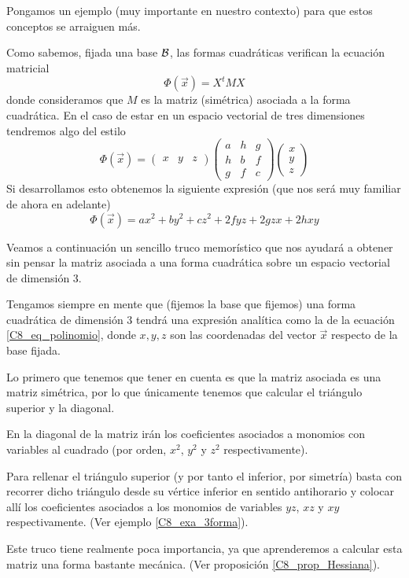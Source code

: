 Pongamos un ejemplo (muy importante en nuestro contexto) para que estos conceptos se arraiguen más.
\begin{exa}
	\label{C8_exa_3forma}
	Como sabemos, fijada una base $\mathcal{B}$, las formas cuadráticas verifican la ecuación matricial
	\[\Phi(\vec{x})=X^tMX\]
	donde consideramos que $M$ es la matriz (simétrica) asociada a la forma cuadrática. En el caso de estar en un espacio vectorial de tres dimensiones tendremos algo del estilo
	\[\Phi(\vec{x})=\begin{pmatrix}
	x & y & z
	\end{pmatrix}\begin{pmatrix}
	a & h & g\\
	h & b & f\\
	g & f & c
	\end{pmatrix}\begin{pmatrix}
	x\\
	y\\
	z
	\end{pmatrix}\]
	Si desarrollamos esto obtenemos la siguiente expresión (que nos será muy familiar de ahora en adelante)
	\begin{equation}
	\label{C8_eq_polinomio}
	\Phi(\vec{x})=ax^2+by^2+cz^2+2fyz+2gzx+2hxy\end{equation}
\end{exa}
Veamos a continuación un sencillo truco memorístico que nos ayudará a obtener sin pensar la matriz asociada a una forma cuadrática sobre un espacio vectorial de dimensión $3$. 
\begin{obs}
	\label{C8_obs_mnemotecnica}
	Tengamos siempre en mente que (fijemos la base que fijemos) una forma cuadrática de dimensión $3$ tendrá una expresión analítica como la de la ecuación \eqref{C8_eq_polinomio}, donde $x,y,z$ son las coordenadas del vector $\vec{x}$ respecto de la base fijada.
	
	Lo primero que tenemos que tener en cuenta es que la matriz asociada es una matriz simétrica, por lo que únicamente tenemos que calcular el triángulo superior y la diagonal.
	
	En la diagonal de la matriz irán los coeficientes asociados a monomios con variables al cuadrado (por orden, $x^2$, $y^2$ y $z^2$ respectivamente).
	
	Para rellenar el triángulo superior (y por tanto el inferior, por simetría) basta con recorrer dicho triángulo desde su vértice inferior en sentido antihorario y colocar allí los coeficientes asociados a los monomios de variables $yz$, $xz$ y $xy$ respectivamente. (Ver ejemplo \ref{C8_exa_3forma}).
	
	Este truco tiene realmente poca importancia, ya que aprenderemos a calcular esta matriz una forma bastante mecánica. (Ver proposición \ref{C8_prop_Hessiana}).
\end{obs}
 
